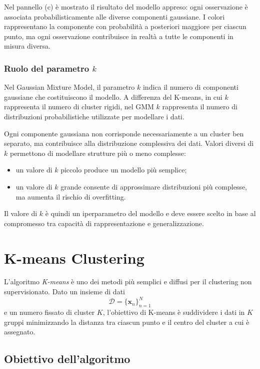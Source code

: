\documentclass[a4paper,12pt]{report}
\begin{document}
Nel pannello (c) è mostrato il risultato del modello appreso: ogni osservazione
è associata probabilisticamente alle diverse componenti gaussiane. I colori
rappresentano la componente con probabilità a posteriori maggiore per ciascun
punto, ma ogni osservazione contribuisce in realtà a tutte le componenti in
misura diversa.

\subsubsection{Ruolo del parametro $k$}

Nel Gaussian Mixture Model, il parametro $k$ indica il numero di componenti
gaussiane che costituiscono il modello.
A differenza del K-means, in cui $k$ rappresenta il numero di cluster rigidi,
nel GMM $k$ rappresenta il numero di distribuzioni probabilistiche utilizzate
per modellare i dati.

Ogni componente gaussiana non corrisponde necessariamente a un cluster ben
separato, ma contribuisce alla distribuzione complessiva dei dati.
Valori diversi di $k$ permettono di modellare strutture più o meno complesse:
\begin{itemize}
\item un valore di $k$ piccolo produce un modello più semplice;
\item un valore di $k$ grande consente di approssimare distribuzioni più complesse,
ma aumenta il rischio di overfitting.
\end{itemize}

Il valore di $k$ è quindi un iperparametro del modello e deve essere scelto
in base al compromesso tra capacità di rappresentazione e generalizzazione.



\section{K-means Clustering}

L’algoritmo \emph{K-means} è uno dei metodi più semplici e diffusi per il clustering non supervisionato.
Dato un insieme di dati
\[
\mathcal{D} = \{ \mathbf{x}_n \}_{n=1}^{N}
\]
e un numero fissato di cluster $K$, l’obiettivo di K-means è suddividere i dati in $K$ gruppi minimizzando la distanza tra ciascun punto e il centro del cluster a cui è assegnato.

\subsection{Obiettivo dell’algoritmo}
\end{document}

